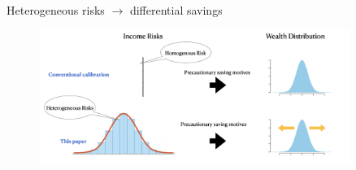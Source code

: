 \documentclass{beamer}
\begin{document}
\begin{frame}{Heterogeneous risks $\rightarrow$ differential savings}
	\begin{figure}
	\centering
	\label{fig: implication1}
	\includegraphics[width=0.9\textwidth]{figures/implication1.png}
\end{figure}
\end{frame}
\end{document}
